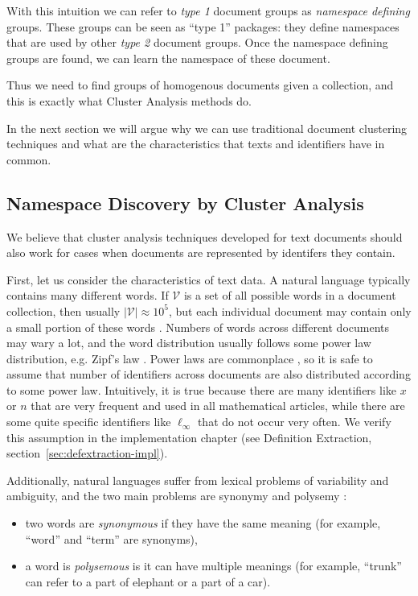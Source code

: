 With this intuition we can refer to \emph{type 1} document groups
as \emph{namespace defining} groups. These groups can be seen as ``type 1''
packages: they define namespaces that are used by other \emph{type 2}
document groups. Once the namespace defining groups are found,
we can learn the namespace of these document.

Thus we need to find groups of homogenous documents given a
collection, and this is exactly what Cluster Analysis methods do.

In the next section we will argue why we can use traditional
document clustering techniques and what are the characteristics
that texts and identifiers have in common.


\subsection{Namespace Discovery by Cluster Analysis} \label{sec:clusters-namespaces}

We believe that cluster analysis techniques developed for text documents
should also work for cases when documents are represented by
identifers they contain.

First, let us consider the characteristics of text data.
A natural language typically contains many different words.
If $\mathcal V$ is a set of all possible words in a document collection,
then usually $|\mathcal V| \approx 10^5$, but each individual document 
may contain only a small portion of these words \cite{manning2008introduction}. 
Numbers of words across different documents may wary a lot, and the 
word distribution usually follows some power law distribution, 
e.g. Zipf's law \cite{manning2008introduction}.
Power laws are commonplace \cite{newman2005power}, so it is safe to assume
that number of identifiers across documents are also distributed according
to some power law. Intuitively, it is true because there are many identifiers
like $x$ or $n$ that are very frequent and used in all mathematical articles,
while there are some quite specific identifiers like $\ell_\infty$ that do
not occur very often. We verify this assumption in the implementation chapter
(see Definition Extraction, section~\ref{sec:defextraction-impl}).


Additionally, natural languages suffer from lexical problems of variability
and ambiguity, and the two main problems are synonymy and polysemy
\cite{deerwester1990indexing} \cite{gliozzo2009semantic}:

\begin{itemize}
\itemsep1pt\parskip0pt
  \item two words are \emph{synonymous} if they have the same meaning
        (for example, ``word'' and ``term'' are synonyms),
  \item a word is \emph{polysemous} is it can have multiple meanings
        (for example, ``trunk'' can refer to a part of elephant or a part of a car).
\end{itemize}

